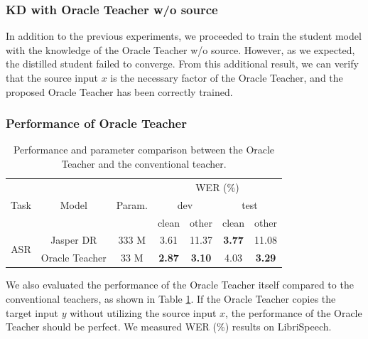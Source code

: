 \documentclass[journal]{IEEEtran}
\begin{document}
\subsubsection{KD with Oracle Teacher w/o source}
In addition to the previous experiments, we proceeded to train the student model with the knowledge of the Oracle Teacher w/o source. However, as we expected, the distilled student failed to converge.
From this additional result, we can verify that the source input $x$ is the necessary factor of the Oracle Teacher, and the proposed Oracle Teacher has been correctly trained.

\subsubsection{Performance of Oracle Teacher} 
\label{per_oracle}
\begin{table}[t]
\centering
\fontsize{7.3}{8.76}\selectfont
\caption{Performance and parameter comparison between the Oracle Teacher and the conventional teacher.}
\begin{tabular}{|c|c|c|cccc|}
\hline
\multirow{3}{*}{Task} & \multirow{3}{*}{Model} & \multirow{3}{*}{Param.} & \multicolumn{4}{c|}{WER (\%)} \\ \cline{4-7} 
 &  &  & \multicolumn{2}{c|}{dev} & \multicolumn{2}{c|}{test} \\ \cline{4-7} 
 &  &  & \multicolumn{1}{c|}{clean} & \multicolumn{1}{c|}{other} & \multicolumn{1}{c|}{clean} & other \\ \hline
\multirow{2}{*}{ASR} & Jasper DR \cite{jasper:scheme}& 333 M & \multicolumn{1}{c|}{3.61} & \multicolumn{1}{c|}{11.37} & \multicolumn{1}{c|}{\textbf{3.77}} & 11.08 \\ \cline{2-7} 
 & Oracle Teacher & 33 M & \multicolumn{1}{c|}{\textbf{2.87}} & \multicolumn{1}{c|}{\textbf{3.10}} & \multicolumn{1}{c|}{4.03} & \textbf{3.29} \\ \hline
\end{tabular}
\label{oracle_perform}
\end{table}
We also evaluated the performance of the Oracle Teacher itself compared to the conventional teachers, as shown in Table \ref{oracle_perform}.
If the Oracle Teacher copies the target input $y$ without utilizing the source input $x$, the performance of the Oracle Teacher should be perfect.
We measured WER (\%) results on LibriSpeech.
\end{document}
